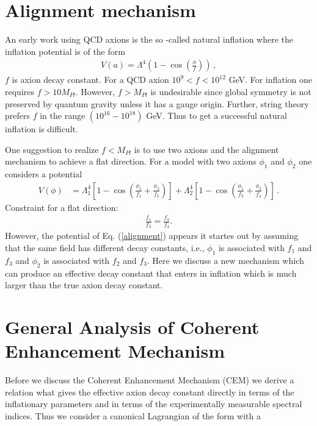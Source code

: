 \documentclass[12pt]{article}
\begin{document}
\section{Alignment mechanism \label{sec2}}

An early work using QCD axions is the so -called natural inflation
where the inflation potential is of the form
\begin{align}
  V(a) = \Lambda^4 \left(1- \cos(\frac{\phi}{f})\right)\,,
\end{align}
$f $ is axion decay constant.
For a QCD axion $10^9 < f <10^{12}$ GeV.
For inflation one requires $f> 10 M_{Pl}$. However,
$f>M_{Pl}$ is undesirable since global symmetry is not preserved by quantum gravity
unless it has a gauge origin.
Further, string theory prefers $f$ in the range $ (10^{16}-10^{18})$ GeV.
Thus to get a successful natural inflation is difficult.


One suggestion to realize $f< M_{Pl}$ is to use two axions and the alignment mechanism to achieve a flat direction.
For a model with two axions $\phi_1$ and $\phi_2$ one considers a potential
\begin{align}
  V(\phi) & = \Lambda^4_1 \left[1- \cos\left(\frac{\phi_1}{f_1} + \frac{\phi_2}{f_2}\right)\right]
  + \Lambda^4_2 \left[1- \cos\left(\frac{\phi_1}{f_3} + \frac{\phi_2}{f_4}\right)\right]\,.
  \label{alignment}
\end{align}
Constraint for a flat direction:
\begin{align}
  \frac{f_1}{f_2}= \frac{f_3}{f_4}.
\end{align}
However, the potential of Eq. (\ref{alignment}) appears it startes out by assuming that the same field
has different decay constants, i.e., $\phi_1$ is associated with $f_1$ and $f_3$ and $\phi_2$ is associated with
$f_2$ and $f_3$. Here we discuss a new mechanism which can produce an effective decay constant
that enters in inflation which is much larger than the true axion decay constant.

\section{General Analysis of Coherent Enhancement Mechanism \label{sec4}}
Before we discuss the Coherent Enhancement Mechanism (CEM) we derive a relation what gives the effective axion decay constant directly
in terms of the inflationary parameters and in terms of the experimentally measurable spectral indices.
Thus we consider a canonical Lagrangian of the form with a
\end{document}
